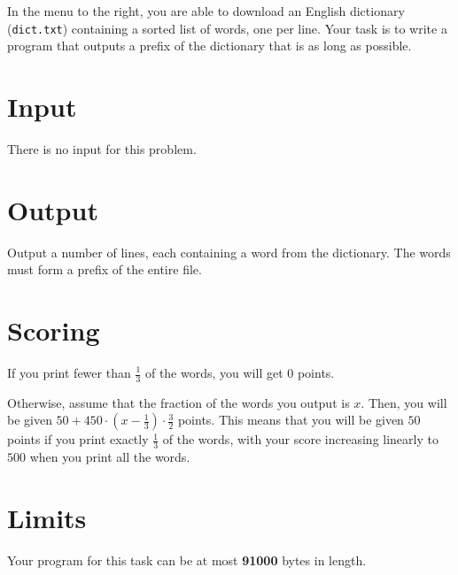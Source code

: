 In the menu to the right, you are able to download an English dictionary (\texttt{dict.txt}) containing a sorted list of words, one per line.
Your task is to write a program that outputs a prefix of the dictionary that is as long as possible.

\section*{Input}
There is no input for this problem.

\section*{Output}
Output a number of lines, each containing a word from the dictionary.
The words must form a prefix of the entire file.

\section*{Scoring}
If you print fewer than $\frac{1}{3}$ of the words, you will get 0 points.

Otherwise, assume that the fraction of the words you output is $x$. Then, you will be given $50 + 450 \cdot (x - \frac{1}{3}) \cdot \frac{3}{2}$ points.
This means that you will be given $50$ points if you print exactly $\frac{1}{3}$ of the words, with your score increasing linearly to $500$ when you print all the words.

\section*{Limits}
Your program for this task can be at most \textbf{91000} bytes in length.
